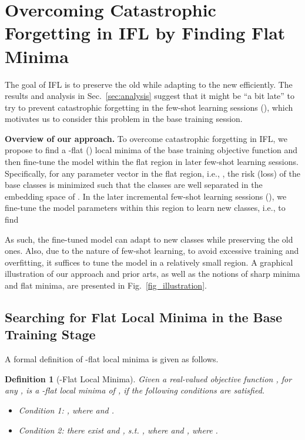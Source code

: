 \documentclass{article}
\newtheorem{mydef}{Definition}
\begin{document}
\section{Overcoming Catastrophic Forgetting in IFL by Finding Flat Minima}
The goal of IFL is to preserve the old while adapting to the new efficiently. The results and analysis in Sec.~\ref{sec:analysis} suggest that it might be ``a bit late'' to try to prevent catastrophic forgetting in the few-shot learning sessions (), which motivates us to consider this problem in the base training session. 

\textbf{Overview of our approach.} 
To overcome catastrophic forgetting in IFL, we propose to find a -flat () local minima  of the base training objective function and then fine-tune the model within the flat region in later few-shot learning sessions.
Specifically, for any parameter vector  in the flat region, i.e., , the risk (loss) of the base classes is minimized such that the classes are well separated in the embedding space of . In the later incremental few-shot learning sessions (), we fine-tune the model parameters within this region to learn new classes, i.e., to find 

As such, the fine-tuned model  can adapt to new classes while preserving the old ones. Also, due to the nature of few-shot learning, to avoid excessive training and overfitting, it suffices to tune the model in a relatively small region. A graphical illustration of our approach and prior arts, as well as the notions of sharp minima and flat minima, are presented in Fig.~\ref{fig_illustration}. 

\subsection{Searching for Flat Local Minima in the Base Training Stage}

A formal definition of -flat local minima is given as follows.

\begin{mydef}[-Flat Local Minima]\label{def:minima}
Given a real-valued objective function , for any ,  is a -flat local minima of , if the following conditions are satisfied.
\begin{itemize}
    \item Condition 1: 
    , where  and . 
    \item Condition 2: 
    there exist  and , s.t. , where  and  , where .
\end{itemize}

\end{mydef}
\end{document}
